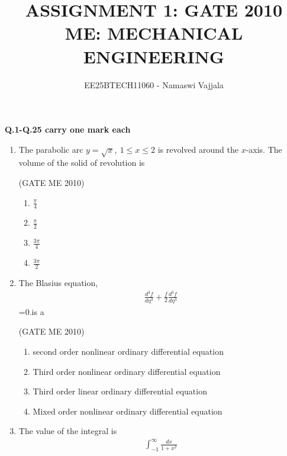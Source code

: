 \documentclass[journal,12pt,onecolumn]{IEEEtran}
\theoremstyle{remark}
\begin{document}
\title{ASSIGNMENT 1: GATE 2010 \\ ME: MECHANICAL ENGINEERING}
\author{EE25BTECH11060 - Namaswi Vajjala}
\maketitle

\renewcommand{\thefigure}{\theenumi}
\renewcommand{\thetable}{\theenumi}

\textbf{Q.1-Q.25 carry one mark each}
\begin{enumerate}
    \item  The parabolic arc $y = \sqrt{x},~1 \le x \le 2$ is revolved around the $x$-axis. The volume of the solid of revolution is

    
    \hfill{(GATE ME 2010)}
\begin{multicols}{4}
\begin{enumerate}
\item  $\frac{\pi}{4}$ 
\item $\frac{\pi}{2}$ 
\item $\frac{3\pi}{4}$ 
\item $\frac{3\pi}{2}$
    \end{enumerate}
\end{multicols}
  

\item The Blasius equation,
 \begin{align*}
\frac{d^3f}{d\eta^3} + \frac{f}{2} \frac{d^3f}{d\eta^3}
\end{align*}
=0.\;is a

 \hfill{(GATE ME 2010)}
    \begin{enumerate}
\item second order nonlinear ordinary differential equation 
\item Third order nonlinear ordinary differential equation
\item Third order linear ordinary differential equation
\item Mixed order nonlinear ordinary differential equation
    \end{enumerate}

 
\item The value of the integral is
\begin{align*}
\int_{-1}^{\infty} \frac{dx}{1 + x^2}
\end{align*}


\end{enumerate}
\end{document}

